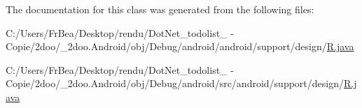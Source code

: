 The documentation for this class was generated from the following files:\begin{CompactItemize}
\item 
C:/Users/FrBea/Desktop/rendu/DotNet\_\-todolist\_ - Copie/2doo/\_\-2doo.Android/obj/Debug/android/android/support/design/\hyperlink{android_2support_2design_2_r_8java}{R.java}\item 
C:/Users/FrBea/Desktop/rendu/DotNet\_\-todolist\_ - Copie/2doo/\_\-2doo.Android/obj/Debug/android/src/android/support/design/\hyperlink{src_2android_2support_2design_2_r_8java}{R.java}\end{CompactItemize}
